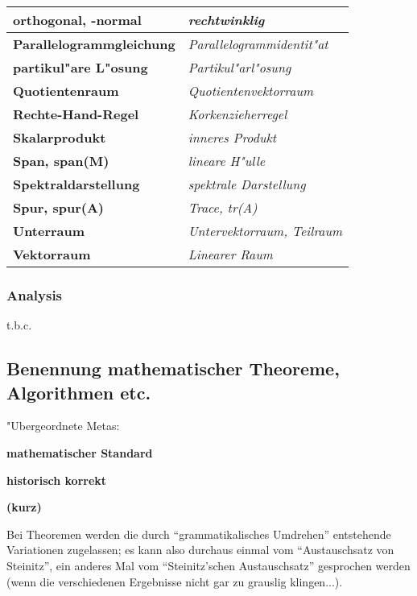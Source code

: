 \begin{minipage}{\linewidth}
\begin{tabular}{!{\vrule width 1pt} >{\bfseries}m{7.5cm} | >{\itshape}m{7.5cm} !{\vrule width 1pt}}
\hline
orthogonal, -normal & rechtwinklig\\
\hline
Parallelogrammgleichung & Parallelogrammidentit"at\\
\hline
partikul"are L"osung & Partikul"arl"osung \\
\hline
Quotientenraum & Quotientenvektorraum \\
\hline
Rechte-Hand-Regel & Korkenzieherregel\\
\hline
Skalarprodukt & inneres Produkt\\
\hline
Span, span(M) & lineare H"ulle\\
\hline
Spektraldarstellung & spektrale Darstellung\\
\hline
Spur, spur(A) & Trace, tr(A)\\
\hline
Unterraum & Untervektorraum, Teilraum\\
\hline
Vektorraum & Linearer Raum\\
\hline
\hline
\end{tabular}
\end{minipage}


\subsubsection{Analysis}\label{benennung_style_ana}

t.b.c.



\clearpage

\subsection{Benennung mathematischer Theoreme, Algorithmen etc.}\label{theoremname_style}

"Ubergeordnete Metas:

\begin{list_sabina}
\item
\textbf{mathematischer Standard}
\item
\textbf{historisch korrekt}
\item
\textbf{(kurz)}
\end{list_sabina}

\vspace{5mm}

Bei Theoremen werden die durch ``grammatikalisches Umdrehen''
entstehende Variationen zugelassen; es kann also durchaus einmal vom
``Austauschsatz von Steinitz'', ein anderes Mal vom ``Steinitz'schen
Austauschsatz'' gesprochen werden (wenn die verschiedenen Ergebnisse
nicht gar zu grauslig klingen...).

